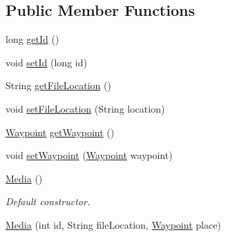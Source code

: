 \subsection*{Public Member Functions}
\begin{DoxyCompactItemize}
\item 
long \hyperlink{classuk_1_1ac_1_1swan_1_1digitaltrails_1_1components_1_1_media_a95632e30057629d0e9ff6e613d03613e}{get\+Id} ()
\item 
void \hyperlink{classuk_1_1ac_1_1swan_1_1digitaltrails_1_1components_1_1_media_ab475679e1c23df3d3aa9a2ee48ee6514}{set\+Id} (long id)
\item 
String \hyperlink{classuk_1_1ac_1_1swan_1_1digitaltrails_1_1components_1_1_media_aa70b54f1d49c650b167f8fc30a7dc833}{get\+File\+Location} ()
\item 
void \hyperlink{classuk_1_1ac_1_1swan_1_1digitaltrails_1_1components_1_1_media_a0b20b6b4f2e330aee183de9f1fe97593}{set\+File\+Location} (String location)
\item 
\hyperlink{classuk_1_1ac_1_1swan_1_1digitaltrails_1_1components_1_1_waypoint}{Waypoint} \hyperlink{classuk_1_1ac_1_1swan_1_1digitaltrails_1_1components_1_1_media_af8ee11c5a0b24ba7a60450e1fb55ec5d}{get\+Waypoint} ()
\item 
void \hyperlink{classuk_1_1ac_1_1swan_1_1digitaltrails_1_1components_1_1_media_a9b3053f2e7e85a4a7a738343adc1bf0b}{set\+Waypoint} (\hyperlink{classuk_1_1ac_1_1swan_1_1digitaltrails_1_1components_1_1_waypoint}{Waypoint} waypoint)
\item 
\hyperlink{classuk_1_1ac_1_1swan_1_1digitaltrails_1_1components_1_1_media_afaba3be6d020574ade908798fe5e4583}{Media} ()
\begin{DoxyCompactList}\small\item\em Default constructor. \end{DoxyCompactList}\item 
\hyperlink{classuk_1_1ac_1_1swan_1_1digitaltrails_1_1components_1_1_media_ad70a21065e0fd9fc33f9993e059ce634}{Media} (int id, String file\+Location, \hyperlink{classuk_1_1ac_1_1swan_1_1digitaltrails_1_1components_1_1_waypoint}{Waypoint} place)
\end{DoxyCompactItemize}
